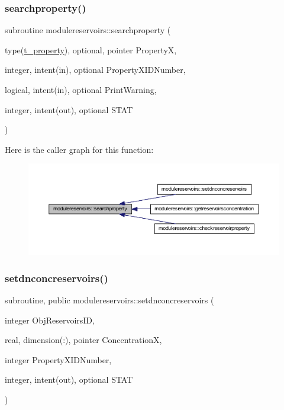 \subsubsection{\texorpdfstring{searchproperty()}{searchproperty()}}
{\footnotesize\ttfamily subroutine modulereservoirs\+::searchproperty (\begin{DoxyParamCaption}\item[{type(\mbox{\hyperlink{structmodulereservoirs_1_1t__property}{t\+\_\+property}}), optional, pointer}]{PropertyX,  }\item[{integer, intent(in), optional}]{Property\+X\+I\+D\+Number,  }\item[{logical, intent(in), optional}]{Print\+Warning,  }\item[{integer, intent(out), optional}]{S\+T\+AT }\end{DoxyParamCaption})\hspace{0.3cm}{\ttfamily [private]}}

Here is the caller graph for this function\+:\nopagebreak
\begin{figure}[H]
\begin{center}
\leavevmode
\includegraphics[width=350pt]{namespacemodulereservoirs_ae21cb91c7b00a7c56ed8f0d763dd75a2_icgraph}
\end{center}
\end{figure}
\mbox{\label{namespacemodulereservoirs_a947f8bf80536f49287e59c0f5d008f17}} 
\subsubsection{\texorpdfstring{setdnconcreservoirs()}{setdnconcreservoirs()}}
{\footnotesize\ttfamily subroutine, public modulereservoirs\+::setdnconcreservoirs (\begin{DoxyParamCaption}\item[{integer}]{Obj\+Reservoirs\+ID,  }\item[{real, dimension(\+:), pointer}]{ConcentrationX,  }\item[{integer}]{Property\+X\+I\+D\+Number,  }\item[{integer, intent(out), optional}]{S\+T\+AT }\end{DoxyParamCaption})}


